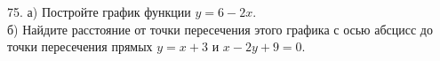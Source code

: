 75. а) Постройте график функции $y=6-2x.$\\
б) Найдите расстояние от точки пересечения этого графика с осью абсцисс до точки пересечения прямых $y=x+3$ и $x-2y+9=0.$\\
